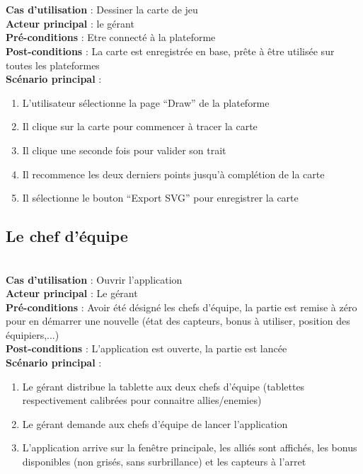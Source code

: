 \paragraph{}
~\\
\textbf{Cas d’utilisation} : Dessiner la carte de jeu\\
\textbf{Acteur principal} : le gérant\\
\textbf{Pré-conditions} : Etre connecté à la plateforme\\
\textbf{Post-conditions} : La carte est enregistrée en base, prête à être utilisée sur toutes les plateformes\\
\textbf{Scénario principal} :
\begin{enumerate}
 \item L’utilisateur sélectionne la page “Draw” de la plateforme
 \item Il clique sur la carte pour commencer à tracer la carte
 \item Il clique une seconde fois pour valider son trait
 \item Il recommence les deux derniers points jusqu'à complétion de la carte
 \item Il sélectionne le bouton “Export SVG” pour enregistrer la carte
\end{enumerate}

\subsection{Le chef d'équipe}
~\\
\textbf{Cas d’utilisation} : Ouvrir l’application\\
\textbf{Acteur principal} : Le gérant\\
\textbf{Pré-conditions} : Avoir été désigné les chefs d’équipe, la partie est remise à zéro pour en démarrer une nouvelle (état des capteurs, bonus à utiliser, position des équipiers,...)\\
\textbf{Post-conditions} : L’application est ouverte, la partie est lancée\\
\textbf{Scénario principal} :
\begin{enumerate}
 \item Le gérant distribue la tablette aux deux chefs d’équipe (tablettes respectivement calibrées pour connaitre allies/enemies)
 \item Le gérant demande aux chefs d’équipe de lancer l’application
 \item L’application arrive sur la fenêtre principale, les alliés sont affichés, les bonus disponibles (non grisés, sans surbrillance) et les capteurs à l’arret
\end{enumerate}

